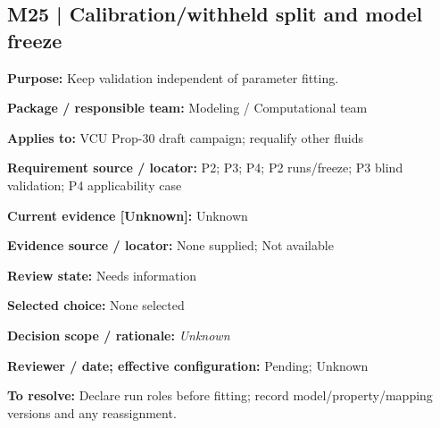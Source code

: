 \documentclass[11pt]{article}
\begin{document}
\par\noindent\begin{minipage}{\textwidth}\small\setlength{\parskip}{2pt}
\subsection*{M25 | Calibration/withheld split and model freeze}
\textbf{Purpose:} Keep validation independent of parameter fitting.\par
\textbf{Package / responsible team:} Modeling / Computational team\par
\textbf{Applies to:} VCU Prop-30 draft campaign; requalify other fluids\par
\textbf{Requirement source / locator:} P2; P3; P4; P2 runs/freeze; P3 blind validation; P4 applicability case\par
\textbf{Current evidence [Unknown]:} Unknown\par
\textbf{Evidence source / locator:} None supplied; Not available\par
\textbf{Review state:} Needs information\par
\textbf{Selected choice:} None selected\par
\textbf{Decision scope / rationale:} \textit{Unknown}\par
\textbf{Reviewer / date; effective configuration:} Pending; Unknown\par
\textbf{To resolve:} Declare run roles before fitting; record model/property/mapping versions and any reassignment.\par
\end{minipage}\par\vspace{5pt}
\end{document}
